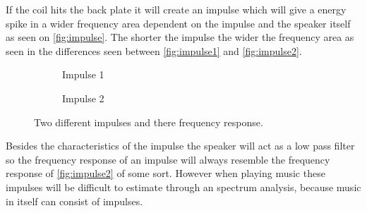 
If the coil hits the back plate it will create an impulse which will give a energy spike in a wider frequency area dependent on the impulse and the speaker itself as seen on \autoref{fig:impulse}. The shorter the impulse the wider the frequency area as seen in the differences seen between \autoref{fig:impulse1} and \autoref{fig:impulse2}.  

\begin{figure}[H]
\begin{subfigure}[t]{0.47\textwidth}
\centering
{}
\scalebox{0.6}{
}
\caption{Impulse 1}
\label{fig:impulse1}
\end{subfigure}
\hspace{6mm} 
\begin{subfigure}[t]{0.47\textwidth}
\centering
{}
\scalebox{0.6}{
}
\caption{Impulse 2}
\label{fig:impulse2}
\end{subfigure}
\caption{Two different impulses and there frequency response.}
\label{fig:impulse}
\end{figure}
Besides the characteristics of the impulse the speaker will act as a low pass filter so the frequency response of an impulse will always resemble the frequency response of \autoref{fig:impulse2} of some sort. However when playing music these impulses will be difficult to estimate through an spectrum analysis, because music in itself can consist of impulses.     


